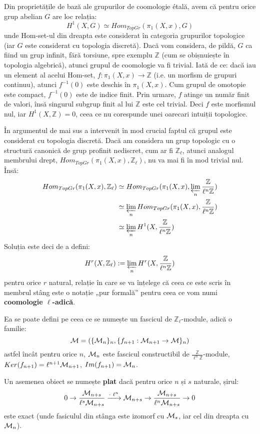 \documentclass[13pt,openany]{book}
\begin{document}
Din proprietățile de bază ale grupurilor de coomologie étală, avem că pentru orice grup abelian $G$ are loc relația:
$$H^1(X,G)\simeq Hom_{TopGr}(\pi_1(X,x),G)$$
unde Hom-set-ul din dreapta este considerat în categoria grupurilor topologice (iar $G$ este considerat cu topologia discretă). Dacă vom considera, de pildă, $G$ ca fiind un grup infinit, fără torsiune, spre exemplu $\mathbb{Z}$ (cum se obișnuiește în topologia algebrică), atunci grupul de coomologie va fi trivial. Iată de ce: dacă iau un element al acelui Hom-set, $f: \pi_1(X,x) \rightarrow \mathbb{Z}$ (i.e. un morfism de grupuri continuu), atunci $f^{-1}(0)$ este deschis în $\pi_1(X,x)$. Cum grupul de omotopie este compact, $f^{-1}(0)$ este de indice finit. Prin urmare, $f$ atinge un număr finit de valori, însă singurul subgrup finit al lui $\mathbb{Z}$ este cel trivial. Deci $f$ este morfismul nul, iar $H^1(X,\mathbb{Z})=0$, ceea ce nu corespunde unei oarecari intuiții topologice.

În argumentul de mai sus a intervenit în mod crucial faptul că grupul este considerat cu topologia discretă. Dacă am considera un grup topologic cu o structură canonică de grup profinit nediscret, cum ar fi $\mathbb{Z}_\ell$, atunci analogul membrului drept, $Hom_{TopGr}(\pi_1(X,x),\mathbb{Z}_\ell)$, nu va mai fi în mod trivial nul. Însă:
\begin{align*}
Hom_{TopGr}(\pi_1(X,x),\mathbb{Z}_\ell)&\simeq Hom_{TopGr}(\pi_1(X,x),\varprojlim_n \frac{\mathbb{Z}}{\ell^n\mathbb{Z}}) \\
&\simeq \varprojlim_n Hom_{TopGr}(\pi_1(X,x), \frac{\mathbb{Z}}{\ell^n\mathbb{Z}}) \\
&\simeq \varprojlim_n H^1(X, \frac{\mathbb{Z}}{\ell^n\mathbb{Z}}) \\
\end{align*}
Soluția este deci de a defini:
$$H^r(X,\mathbb{Z}_\ell):=\varprojlim_n H^r(X, \frac{\mathbb{Z}}{\ell^n\mathbb{Z}})$$
pentru orice $r$ natural, relație în care se va înțelege că ceea ce este scris în membrul stâng este o notație „pur formală” pentru ceea ce vom numi {\bf coomologie $\ell$-adică}.

Ea se poate defini pe ceea ce se numește un fascicul de $\mathbb{Z}_\ell$-module, adică o familie:
$$\mathcal{M}=(\{\mathcal{M}_n\}_n,\{f_{n+1}:\mathcal{M}_{n+1}\rightarrow\mathcal{M}\}_n)$$
astfel încât pentru orice $n$, $\mathcal{M}_n$ este fascicul constructibil de $\frac{\mathbb{Z}}{\ell^n\mathbb{Z}}$-module, $Ker(f_{n+1})=\ell^{n+1}\mathcal{M}_{n+1}$, $Im(f_{n+1})=\mathcal{M}_n$.

Un asemenea obiect se numește {\bf plat} dacă pentru orice $n$ și $s$ naturale, șirul:
$$0 \rightarrow \frac{\mathcal{M}_{n+s}}{\ell^s\mathcal{M}_{n+s}} \xrightarrow{\cdot\ \ell^n} \mathcal{M}_{n+s} \rightarrow \frac{\mathcal{M}_{n+s}}{\ell^n\mathcal{M}_{n+s}} \rightarrow 0$$
este exact (unde fasiculul din stânga este izomorf cu $\mathcal{M}_s$, iar cel din dreapta cu $\mathcal{M}_n$).
\end{document}
